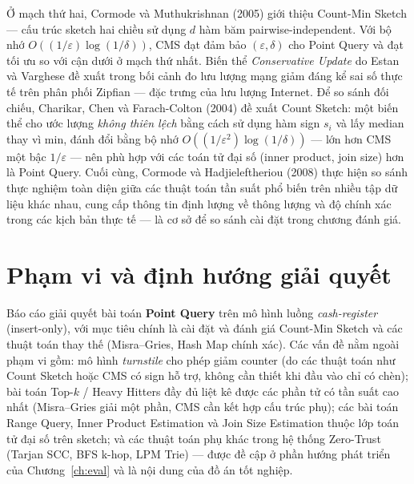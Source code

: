 Ở mạch thứ hai, Cormode và Muthukrishnan (2005) \cite{cormode2005cms} giới thiệu Count-Min Sketch --- cấu trúc sketch hai chiều sử dụng $d$ hàm băm pairwise-independent. Với bộ nhớ $O((1/\varepsilon)\log(1/\delta))$, CMS đạt đảm bảo $(\varepsilon, \delta)$ cho Point Query và đạt tối ưu so với cận dưới ở mạch thứ nhất. Biến thể \textit{Conservative Update} do Estan và Varghese \cite{estan2003conservative} đề xuất trong bối cảnh đo lưu lượng mạng giảm đáng kể sai số thực tế trên phân phối Zipfian --- đặc trưng của lưu lượng Internet. Để so sánh đối chiếu, Charikar, Chen và Farach-Colton (2004) \cite{charikar2004count} đề xuất Count Sketch: một biến thể cho ước lượng \textit{không thiên lệch} bằng cách sử dụng hàm sign $s_i$ và lấy median thay vì min, đánh đổi bằng bộ nhớ $O((1/\varepsilon^2)\log(1/\delta))$ --- lớn hơn CMS một bậc $1/\varepsilon$ --- nên phù hợp với các toán tử đại số (inner product, join size) hơn là Point Query. Cuối cùng, Cormode và Hadjieleftheriou (2008) \cite{cormode2008finding} thực hiện so sánh thực nghiệm toàn diện giữa các thuật toán tần suất phổ biến trên nhiều tập dữ liệu khác nhau, cung cấp thông tin định lượng về thông lượng và độ chính xác trong các kịch bản thực tế --- là cơ sở để so sánh cài đặt trong chương đánh giá.

\section{Phạm vi và định hướng giải quyết}
\label{sec:scope-and-choice}

Báo cáo giải quyết bài toán \textbf{Point Query} trên mô hình luồng \textit{cash-register} (insert-only), với mục tiêu chính là cài đặt và đánh giá Count-Min Sketch và các thuật toán thay thế (Misra--Gries, Hash Map chính xác). Các vấn đề nằm ngoài phạm vi gồm: mô hình \textit{turnstile} cho phép giảm counter (do các thuật toán như Count Sketch hoặc CMS có sign hỗ trợ, không cần thiết khi đầu vào chỉ có chèn); bài toán Top-$k$ / Heavy Hitters đầy đủ liệt kê được các phần tử có tần suất cao nhất (Misra--Gries giải một phần, CMS cần kết hợp cấu trúc phụ); các bài toán Range Query, Inner Product Estimation và Join Size Estimation thuộc lớp toán tử đại số trên sketch; và các thuật toán phụ khác trong hệ thống Zero-Trust (Tarjan SCC, BFS k-hop, LPM Trie) --- được đề cập ở phần hướng phát triển của Chương~\ref{ch:eval} và là nội dung của đồ án tốt nghiệp.

